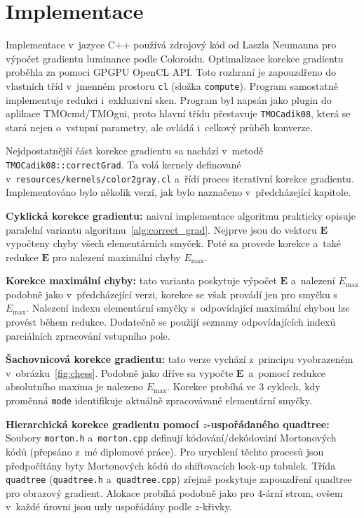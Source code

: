 \documentclass[11pt,a4paper,oneside]{article}
\begin{document}
	\section{Implementace}
	Implementace v~jazyce C++ používá zdrojový kód od Laszla Neumanna pro výpočet gradientu luminance
	podle Coloroidu. Optimalizace korekce gradientu proběhla za pomoci GPGPU OpenCL API. Toto rozhraní
	je zapouzdřeno do vlastních tříd v~jmenném prostoru \texttt{cl} (složka \texttt{compute}). Program
	samostatně implementuje redukci i~exkluzivní sken. Program byl napsán jako plugin do aplikace
	TMOcmd/TMOgui, proto hlavní třídu přestavuje \texttt{TMOCadik08}, která se stará nejen o~vstupní
	parametry, ale ovládá i~celkový průběh konverze.

	Nejdpostatnější část korekce gradientu sa nachází v~metodě \\
	\texttt{TMOCadik08::correctGrad}. Ta volá kernely definované \\
	v~\texttt{resources/kernels/color2gray.cl} a~řídí proces iterativní
	korekce gradientu. Implementováno bylo několik verzí, jak bylo naznačeno v~předcházející kapitole.

	\textbf{Cyklická korekce gradientu:} \; naivní implementace algoritmu prakticky opisuje
	paralelní variantu algoritmu~\ref{alg:correct_grad}. Nejprve jsou do vektoru $\textbf{E}$
	vypočteny chyby všech elementárních smyček. Poté sa provede korekce a~také redukce $\textbf{E}$
	pro nalezení maximální chyby $E_{\max}$.

	\textbf{Korekce maximální chyby:} \; tato varianta poskytuje výpočet $\textbf{E}$ a~nalezení
	$E_{\max}$ podobně jako v~předcházející verzi, korekce se však provádí jen pro smyčku s~$E_{\max}$.
	Nalezení indexu elementární smyčky s~odpovídající maximální chybou lze provést během redukce.
	Dodatečně se použijí seznamy odpovídajících indexů parciálních zpracování vstupního pole.

	\textbf{Šachovnicová korekce gradientu:} \; tato verze vychází z~principu vyobrazeném
	v~obrázku~\ref{fig:chess}. Podobně jako dříve sa vypočte $\textbf{E}$ a~pomocí redukce absolutního maxima
	je nalezeno $E_{\max}$. Korekce probíhá ve 3 cyklech, kdy proměnná \texttt{mode} identifikuje aktuálně
	zpracovávané elementární smyčky.

	\textbf{Hierarchická korekce gradientu pomocí $z$-uspořádaného quadtree:} \;
	Soubory \texttt{morton.h} a~\texttt{morton.cpp} definují kódování/dekódování Mortonových kódů
	(přepsáno z~mé diplomové práce). Pro urychlení těchto procesů jsou předpočítány byty Mortonových kódů
	do shiftovacích look-up tabulek. Třída \texttt{quadtree} (\texttt{quadtree.h} a~\texttt{quadtree.cpp})
	zřejmě poskytuje zapouzdření quadtree pro obrazový gradient. Alokace probíhá podobně jako pro 4-ární
	strom, ovšem v~každé úrovni jsou uzly uspořádány podle $z$-křivky.
\end{document}
